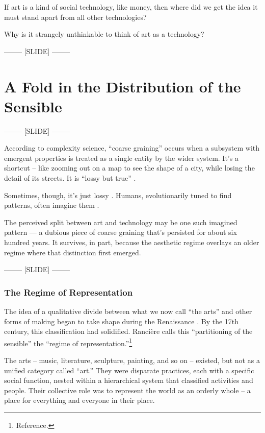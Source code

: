\documentclass[letter:wpaper]{article}
\begin{document}
    If art is a kind of social technology, like money, then where did we get the idea it must stand apart from all other technologies?

    Why is it strangely unthinkable to think of art as a technology?

    -------- [SLIDE] --------

\section{A Fold in the Distribution of the Sensible}
    
-------- [SLIDE] --------

    According to complexity science, ``coarse graining'' occurs when a subsystem with emergent properties is treated as a single entity by the wider system. It’s a shortcut -- like zooming out on a map to see the shape of a city, while losing the detail of its streets. It is ``lossy but true'' \citep[p.4]{FlackCrsGrnng2017}.

    Sometimes, though, it’s just lossy \citep[p.8]{FlackCrsGrnng2017}. Humans, evolutionarily tuned to find patterns, often imagine them \citep{FristonThFrEnrgPrncpl2010}.

    The perceived split between art and technology may be one such imagined pattern — a dubious piece of coarse graining that’s persisted for about six hundred years. It survives, in part, because the aesthetic regime overlays an older regime where that distinction first emerged.
    
-------- [SLIDE] --------

    \subsubsection{The Regime of Representation}

    The idea of a qualitative divide between what we now call ``the arts'' and other forms of making began to take shape during the Renaissance \citep[p.136]{TatarkiewiczWhtIsArt1971}. By the 17th century, this classification had solidified. Rancière calls this ``partitioning of the sensible'' the ``regime of representation.''\footnote{Reference.}

    The arts -- music, literature, sculpture, painting, and so on -- existed, but not as a unified category called ``art.'' They were disparate practices, each with a specific social function, nested within a hierarchical system that classified activities and people. Their collective role was to represent the world as an orderly whole -- a place for everything and everyone in their place.
\end{document}
